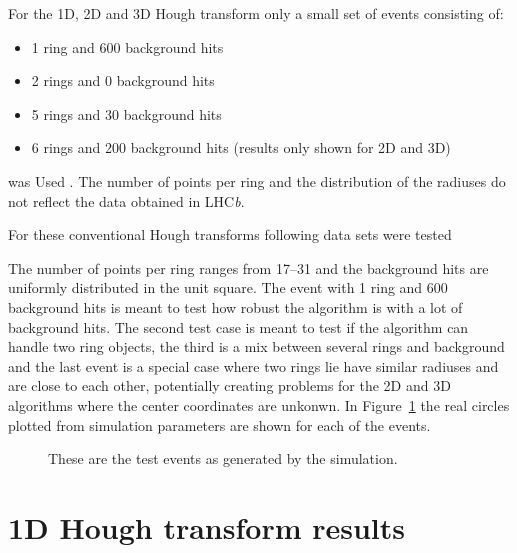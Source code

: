 \documentclass[11pt]{scrreprt}
\begin{document}
For the 1D, 2D and 3D Hough transform only a small set of events consisting of:
\begin{itemize}
  \item 1 ring and 600 background hits
  \item 2 rings and 0 background hits
  \item 5 rings and 30 background hits
  \item 6 rings and 200 background hits (results only shown for 2D and 3D)
\end{itemize}
was Used . The number of points per ring and the distribution of the radiuses do not reflect the data obtained in LHC\textit{b}.

For these conventional Hough transforms following data sets were tested

The number of points per ring ranges from 17--31 and the background hits are uniformly distributed in the unit square. The event with 1
ring and 600 background hits is meant to test how robust the algorithm is with a 
lot of background hits. The second test case is meant to test if the algorithm can handle two ring objects, the third is a mix between several rings and background and the last event is a special case where two rings lie have similar radiuses and are close to each other, potentially creating problems for the 2D and 3D algorithms where the center coordinates are unkonwn. In Figure~\ref{fig:real_ht_results}
the real circles plotted from simulation parameters are shown for each of the events.

\begin{figure}
\centering
                \label{fig:real_1c600bg}%
                \label{fig:real_2c0bg}

                \label{fig:real_5c30bg}%
                \label{fig:real_6c_200bg}%
        \caption{These are the test events as generated by the simulation.\label{fig:real_ht_results}}
\end{figure}

\section{1D Hough transform results} %
\label{sec:1d_hough_transform_results}
\end{document}
